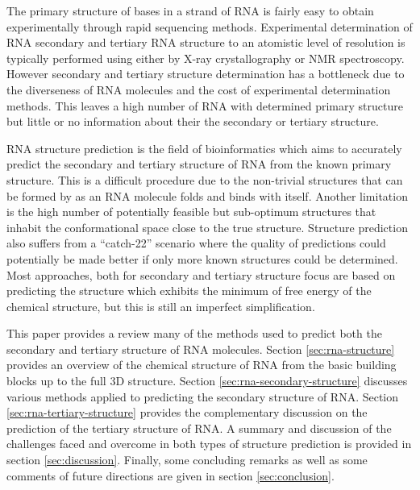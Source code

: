 \documentclass[journal]{IEEEtran}
\begin{document}
The primary structure of bases in a strand of RNA is fairly easy to obtain experimentally through rapid sequencing methods. Experimental determination of RNA secondary and tertiary RNA structure to an atomistic level of resolution is typically performed using either by X-ray crystallography or NMR spectroscopy. However secondary and tertiary structure determination has a bottleneck due to the diverseness of RNA molecules and the cost of experimental determination methods\cite{ya2014rna}. This leaves a high number of RNA with determined primary structure but little or no information about their the secondary or tertiary structure.

RNA structure prediction is the field of bioinformatics which aims to accurately predict the secondary and tertiary structure of RNA from the known primary structure. This is a difficult procedure due to the non-trivial structures that can be formed by as an RNA molecule folds and binds with itself. Another limitation is the high number of potentially feasible but sub-optimum structures that inhabit the conformational space close to the true structure. Structure prediction also suffers from a ``catch-22'' scenario where the quality of predictions could potentially be made better if only more known structures could be determined. Most approaches, both for secondary and tertiary structure focus are based on predicting the structure which exhibits the minimum of free energy of the chemical structure, but this is still an imperfect simplification.

This paper provides a review many of the methods used to predict both the secondary and tertiary structure of RNA molecules. Section \ref{sec:rna-structure} provides an overview of the chemical structure of RNA from the basic building blocks up to the full 3D structure. Section \ref{sec:rna-secondary-structure} discusses various methods applied to predicting the secondary structure of RNA. Section \ref{sec:rna-tertiary-structure} provides the complementary discussion on the prediction of the tertiary structure of RNA. A summary and discussion of the challenges faced and overcome in both types of structure prediction is provided in section \ref{sec:discussion}. Finally, some concluding remarks as well as some comments of future directions are given in section \ref{sec:conclusion}.
\end{document}
